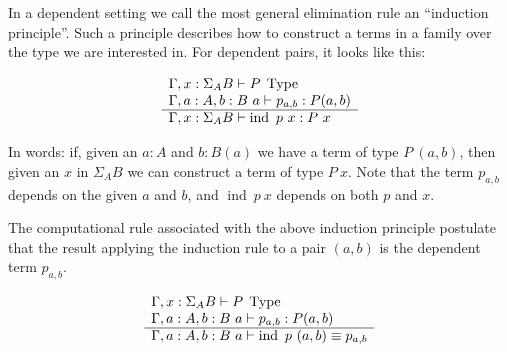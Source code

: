 In a dependent setting we call the most general elimination rule an ``induction
principle''. Such a principle describes how to construct a terms in a family
over the type we are interested in. For dependent pairs, it looks like this:

\begin{equation*}
  \begin{array}[t]{l}
    \Gamma, x : \Sigma_A B \vdash P \; \operatorname{Type}\\
    \Gamma, a : A, b : B~a \vdash p_{a,b} : P (a,b)\\
    \hline
    \Gamma, x : \Sigma_A B \vdash \operatorname{ind}~p~x : P~x
  \end{array}
\end{equation*}

In words: if, given an $a : A$ and $b : B (a)$ we have a term of type $P~(a,b)$,
then given an $x$ in $\Sigma_A B$ we can construct a term of type $P~x$. Note
that the term $p_{a,b}$ depends on the given $a$ and $b$, and $\operatorname{ind}~p~x$
depends on both $p$ and $x$.

The computational rule associated with the above induction principle postulate
that the result applying the induction rule to a pair $(a,b)$ is the dependent
term $p_{a,b}$.

\begin{equation*}
  \begin{array}[t]{l}
    \Gamma, x : \Sigma_A B \vdash P \; \operatorname{Type}\\
    \Gamma, a : A, b : B~a \vdash p_{a,b} : P (a,b)\\
    \hline
    \Gamma, a : A, b : B~a \vdash \operatorname{ind}~p~(a,b) \equiv p_{a,b}
  \end{array}
\end{equation*}



